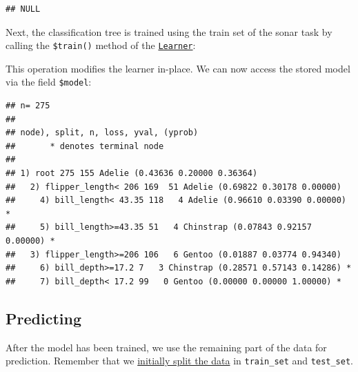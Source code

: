 \documentclass[
]{scrbook}
\newenvironment{Shaded}{\begin{snugshade}}{\end{snugshade}}
\newcommand{\AttributeTok}[1]{\textcolor[rgb]{0.77,0.63,0.00}{#1}}
\newcommand{\FunctionTok}[1]{\textcolor[rgb]{0.00,0.00,0.00}{#1}}
\newcommand{\NormalTok}[1]{#1}
\newcommand{\OtherTok}[1]{\textcolor[rgb]{0.56,0.35,0.01}{#1}}
\newcommand{\SpecialCharTok}[1]{\textcolor[rgb]{0.00,0.00,0.00}{#1}}
\renewenvironment{Shaded} {\begin{snugshade}\small} {\end{snugshade}}
\begin{document}
\begin{verbatim}
## NULL
\end{verbatim}

Next, the classification tree is trained using the train set of the sonar task by calling the \texttt{\$train()} method of the \href{https://mlr3.mlr-org.com/reference/Learner.html}{\texttt{Learner}}:

\begin{Shaded}
\end{Shaded}

This operation modifies the learner in-place.
We can now access the stored model via the field \texttt{\$model}:

\begin{Shaded}
\end{Shaded}

\begin{verbatim}
## n= 275 
## 
## node), split, n, loss, yval, (yprob)
##       * denotes terminal node
## 
## 1) root 275 155 Adelie (0.43636 0.20000 0.36364)  
##   2) flipper_length< 206 169  51 Adelie (0.69822 0.30178 0.00000)  
##     4) bill_length< 43.35 118   4 Adelie (0.96610 0.03390 0.00000) *
##     5) bill_length>=43.35 51   4 Chinstrap (0.07843 0.92157 0.00000) *
##   3) flipper_length>=206 106   6 Gentoo (0.01887 0.03774 0.94340)  
##     6) bill_depth>=17.2 7   3 Chinstrap (0.28571 0.57143 0.14286) *
##     7) bill_depth< 17.2 99   0 Gentoo (0.00000 0.00000 1.00000) *
\end{verbatim}

\hypertarget{predicting}{%
\subsection{Predicting}\label{predicting}}

After the model has been trained, we use the remaining part of the data for prediction.
Remember that we \protect\hyperlink{split-data}{initially split the data} in \texttt{train\_set} and \texttt{test\_set}.

\begin{Shaded}
\end{Shaded}
\end{document}
